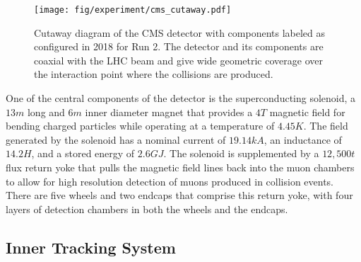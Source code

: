 \begin{figure}[htbp]
  \centering
  \texttt{[image: fig/experiment/cms\_cutaway.pdf]}
  \caption{
    Cutaway diagram of the CMS detector with components labeled as configured in 2018 for Run 2.
    The detector and its components are coaxial with the LHC beam and give wide geometric coverage over the interaction point where the collisions are produced.
  }
  \label{fig:CMScut}
\end{figure}

One of the central components of the detector is the superconducting solenoid, a $13\unit{m}$ long and $6\unit{m}$ inner diameter magnet that provides a $4\unit{T}$ magnetic field for bending charged particles while operating at a temperature of $4.45\unit{K}$.
The field generated by the solenoid has a nominal current of $19.14\unit{kA}$, an inductance of $14.2\unit{H}$, and a stored energy of $2.6\unit{GJ}$.
The solenoid is supplemented by a $12,500\unit{t}$ flux return yoke that pulls the magnetic field lines back into the muon chambers to allow for high resolution detection of muons produced in collision events.
There are five wheels and two endcaps that comprise this return yoke, with four layers of detection chambers in both the wheels and the endcaps.

\subsection{Inner Tracking System}
\label{subsec:tracking}

